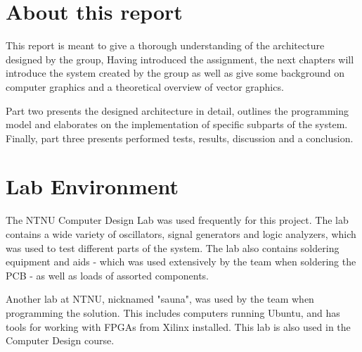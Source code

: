 \section{About this report}

This report is meant to give a thorough understanding of the architecture designed by the group,
Having introduced the assignment, the next chapters will introduce the system created by the group as well as give some background on computer graphics and a theoretical overview of vector graphics.


Part two presents the designed architecture in detail, outlines the programming model and elaborates on the implementation of specific subparts of the system.
Finally, part three presents performed tests, results, discussion and a conclusion.


\section{Lab Environment}
The NTNU Computer Design Lab was used frequently for this project. The lab contains a wide variety of oscillators, signal generators and logic analyzers, which was used to test different parts of the system. The lab also contains soldering equipment and aids - which was used extensively by the team when soldering the PCB - as well as loads of assorted components.

Another lab at NTNU, nicknamed "sauna", was used by the team when programming the solution. This includes computers running Ubuntu, and has tools for working with FPGAs from Xilinx installed. This lab is also used in the Computer Design course.